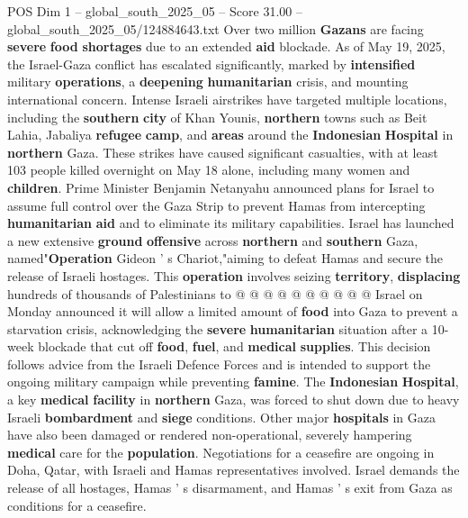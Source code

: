 \begin{textsample}{POS Dim 1 – global\_south\_2025\_05 – Score 31.00 – global\_south\_2025\_05/124884643.txt}  \label{ex:f1_pos_067}
Over two million \textbf{Gazans} are facing \textbf{severe} \textbf{food} \textbf{shortages} due to an extended \textbf{aid} blockade.
As of May 19, 2025, the Israel-Gaza conflict has escalated significantly, marked by \textbf{intensified} military \textbf{operations}, a \textbf{deepening} \textbf{humanitarian} crisis, and mounting international concern.
Intense Israeli airstrikes have targeted multiple locations, including the \textbf{southern} \textbf{city} of Khan Younis, \textbf{northern} towns such as Beit Lahia, Jabaliya \textbf{refugee} \textbf{camp}, and \textbf{areas} around the \textbf{Indonesian} \textbf{Hospital} in \textbf{northern} Gaza.
These strikes have caused significant casualties, with at least 103 people killed overnight on May 18 alone, including many women and \textbf{children}.
Prime Minister Benjamin Netanyahu announced plans for Israel to assume full control over the Gaza Strip to prevent Hamas from intercepting \textbf{humanitarian} \textbf{aid} and to eliminate its military capabilities.
Israel has launched a new extensive \textbf{ground} \textbf{offensive} across \textbf{northern} and \textbf{southern} Gaza, named"\textbf{Operation} Gideon ' s Chariot,"aiming to defeat Hamas and secure the release of Israeli hostages.
This \textbf{operation} involves seizing \textbf{territory}, \textbf{displacing} hundreds of thousands of Palestinians to @ @ @ @ @ @ @ @ @ @ Israel on Monday announced it will allow a limited amount of \textbf{food} into Gaza to prevent a starvation crisis, acknowledging the \textbf{severe} \textbf{humanitarian} situation after a 10-week blockade that cut off \textbf{food}, \textbf{fuel}, and \textbf{medical} \textbf{supplies}.
This decision follows advice from the Israeli Defence Forces and is intended to support the ongoing military campaign while preventing \textbf{famine}.
The \textbf{Indonesian} \textbf{Hospital}, a key \textbf{medical} \textbf{facility} in \textbf{northern} Gaza, was forced to shut down due to heavy Israeli \textbf{bombardment} and \textbf{siege} conditions.
Other major \textbf{hospitals} in Gaza have also been damaged or rendered non-operational, severely hampering \textbf{medical} care for the \textbf{population}.
Negotiations for a ceasefire are ongoing in Doha, Qatar, with Israeli and Hamas representatives involved.
Israel demands the release of all hostages, Hamas ' s disarmament, and Hamas ' s exit from Gaza as conditions for a ceasefire.

\end{textsample}

